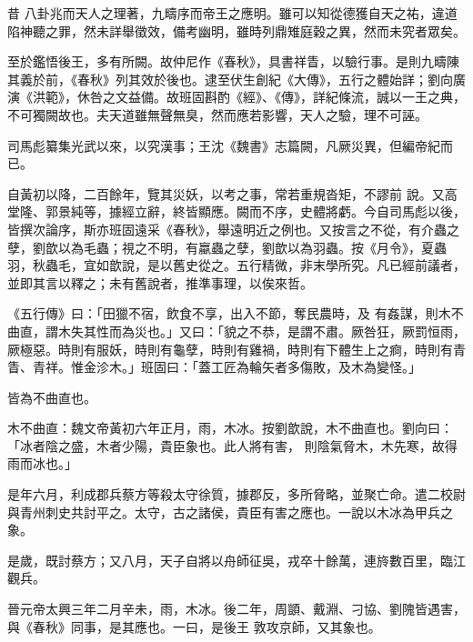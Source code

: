 
\begin{pinyinscope}

 昔
 八卦兆而天人之理著，九疇序而帝王之應明。雖可以知從德獲自天之祐，違道陷神聽之罪，然未詳舉徵效，備考幽明，雖時列鼎雉庭穀之異，然而未究者眾矣。



 至於鑑悟後王，多有所闕。故仲尼作《春秋》，具書祥眚，以驗行事。是則九疇陳其義於前，《春秋》列其效於後也。逮至伏生創紀《大傳》，五行之體始詳；劉向廣演《洪範》，休咎之文益備。故班固斟酌《經》、《傳》，詳紀條流，誠以一王之典，不可獨闕故也。夫天道雖無聲無臭，然而應若影響，天人之驗，理不可誣。



 司馬彪纂集光武以來，以究漢事；王沈《魏書》志篇闕，凡厥災異，但編帝紀而已。



 自黃初以降，二百餘年，覽其災妖，以考之事，常若重規沓矩，不謬前
 說。又高堂隆、郭景純等，據經立辭，終皆顯應。闕而不序，史體將虧。今自司馬彪以後，皆撰次論序，斯亦班固遠采《春秋》，舉遠明近之例也。又按言之不從，有介蟲之孽，劉歆以為毛蟲；視之不明，有蠃蟲之孽，劉歆以為羽蟲。按《月令》，夏蟲羽，秋蟲毛，宜如歆說，是以舊史從之。五行精微，非末學所究。凡已經前議者，並即其言以釋之；未有舊說者，推準事理，以俟來哲。



 《五行傳》曰：「田獵不宿，飲食不享，出入不節，奪民農時，及
 有姦謀，則木不曲直，謂木失其性而為災也。」又曰：「貌之不恭，是謂不肅。厥咎狂，厥罰恒雨，厥極惡。時則有服妖，時則有龜孽，時則有雞禍，時則有下體生上之痾，時則有青眚、青祥。惟金沴木。」班固曰：「蓋工匠為輪矢者多傷敗，及木為變怪。」



 皆為不曲直也。



 木不曲直：魏文帝黃初六年正月，雨，木冰。按劉歆說，木不曲直也。劉向曰：「冰者陰之盛，木者少陽，貴臣象也。此人將有害，
 則陰氣脅木，木先寒，故得雨而冰也。」



 是年六月，利成郡兵蔡方等殺太守徐質，據郡反，多所脅略，並聚亡命。遣二校尉與青州刺史共討平之。太守，古之諸侯，貴臣有害之應也。一說以木冰為甲兵之象。



 是歲，既討蔡方；又八月，天子自將以舟師征吳，戎卒十餘萬，連旍數百里，臨江觀兵。



 晉元帝太興三年二月辛未，雨，木冰。後二年，周顗、戴淵、刁協、劉隗皆遇害，與《春秋》同事，是其應也。一曰，是後王
 敦攻京師，又其象也。




\end{pinyinscope}
